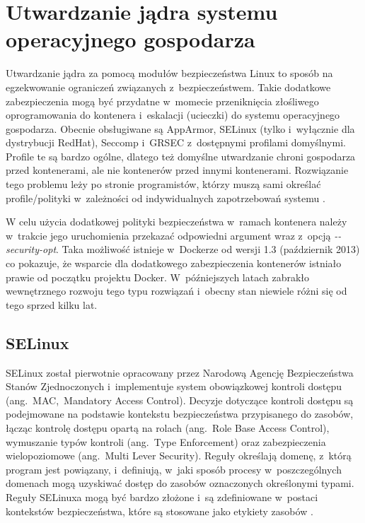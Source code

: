 \section{Utwardzanie jądra systemu operacyjnego gospodarza}

Utwardzanie jądra za pomocą modułów bezpieczeństwa Linux to sposób na egzekwowanie ograniczeń związanych z~bezpieczeństwem. Takie dodatkowe zabezpieczenia mogą być przydatne w~momecie przeniknięcia złośliwego oprogramowania do kontenera i~eskalacji (ucieczki) do systemu operacyjnego gospodarza. Obecnie obsługiwane są AppArmor, SELinux (tylko i~wyłącznie dla dystrybucji RedHat), Seccomp i~GRSEC z~dostępnymi profilami domyślnymi. Profile te są bardzo ogólne, dlatego też domyślne utwardzanie chroni gospodarza przed kontenerami, ale nie kontenerów przed innymi kontenerami. Rozwiązanie tego problemu leży po stronie programistów, którzy muszą sami określać profile/polityki w~zależności od indywidualnych zapotrzebowań systemu \cite{MobyDockerDefaultAppArmorProfile}\cite{MillerSecuringYourContainers}.

W celu użycia dodatkowej polityki bezpieczeństwa w~ramach kontenera należy w~trakcie jego uruchomienia przekazać odpowiedni argument wraz z~opcją \textit{-{}-security-opt}. Taka możliwość istnieje w~Dockerze od wersji 1.3 (październik 2013) co pokazuje, że wsparcie dla dodatkowego zabezpieczenia kontenerów istniało prawie od początku projektu Docker. W~późniejszych latach zabrakło wewnętrznego rozwoju tego typu rozwiązań i~obecny stan niewiele różni się od tego sprzed kilku lat.

\subsection{SELinux}

SELinux został pierwotnie opracowany przez Narodową Agencję Bezpieczeństwa Stanów Zjednoczonych i~implementuje system obowiązkowej kontroli dostępu (ang.~MAC,~Mandatory Access Control). Decyzje dotyczące kontroli dostępu są podejmowane na podstawie kontekstu bezpieczeństwa przypisanego do zasobów, łącząc kontrolę dostępu opartą na rolach (ang.~Role Base Access Control), wymuszanie typów kontroli (ang.~Type Enforcement) oraz zabezpieczenia wielopoziomowe (ang.~Multi Lever Security). Reguły określają domenę, z~którą program jest powiązany, i~definiują, w~jaki sposób procesy w~poszczególnych domenach mogą uzyskiwać dostęp do zasobów oznaczonych określonymi typami. Reguły SELinuxa mogą być bardzo złożone i~są zdefiniowane w~postaci kontekstów bezpieczeństwa, które są stosowane jako etykiety zasobów \cite{SchreudersEmpoweringEndUsersToConfineTheirOwnApplications}.

